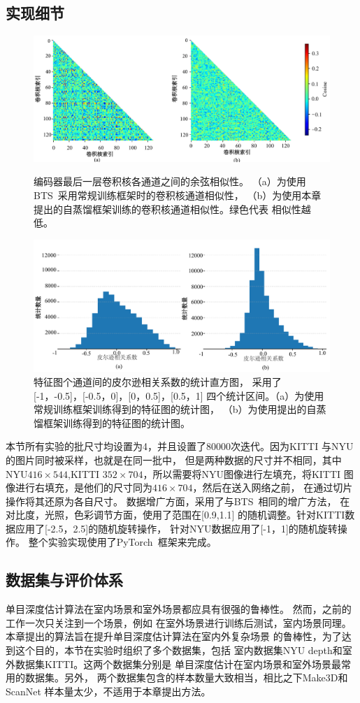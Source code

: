 \subsection{实现细节}
\begin{figure}[t]
  \centering
  \includegraphics[width=0.85\linewidth]{figure/conv_co.pdf}
  \caption{编码器最后一层卷积核各通道之间的余弦相似性。
（a）为使用BTS~\cite{bts}采用常规训练框架时的卷积核通道相似性，
（b）为使用本章提出的自蒸馏框架训练的卷积核通道相似性。绿色代表
相似性越低。}
  \label{fig:conv_co}
  \includegraphics[width=0.85\linewidth]{figure/fea_co.pdf}
  \caption{特征图个通道间的皮尔逊相关系数的统计直方图，
  采用了[-1，-0.5]，[-0.5，0]，[0，0.5]，[0.5，1]
  四个统计区间。（a）为使用常规训练框架训练得到的特征图的统计图，
  （b）为使用提出的自蒸馏框架训练得到的特征图的统计图。}
  \label{fig:fea_co}
\end{figure}
本节所有实验的批尺寸均设置为4，并且设置了80000次迭代。因为KITTI
与NYU的图片同时被采样，也就是在同一批中，
但是两种数据的尺寸并不相同，其中NYU$416\times544$,KITTI
$352\times704$，所以需要将NYU图像进行左填充，将KITTI
图像进行右填充，是他们的尺寸同为$416\times704$，然后在送入网络之前，
在通过切片操作将其还原为各自尺寸。
数据增广方面，采用了与BTS~\cite{bts}相同的增广方法，
在对比度，光照，色彩调节方面，使用了范围在[0.9,1.1]
的随机调整。针对KITTI数据应用了[-2.5，2.5]的随机旋转操作，
针对NYU数据应用了[-1，1]的随机旋转操作。
整个实验实现使用了PyTorch~\cite{paszke2019pytorch}框架来完成。
\subsection{数据集与评价体系}
单目深度估计算法在室内场景和室外场景都应具有很强的鲁棒性。
然而，之前的工作一次只关注到一个场景，例如
在室外场景进行训练后测试，室内场景同理。
本章提出的算法旨在提升单目深度估计算法在室内外复杂场景
的鲁棒性，为了达到这个目的，本节在实验时组织了多个数据集，包括
室内数据集NYU depth和室外数据集KITTI。这两个数据集分别是
单目深度估计在室内场景和室外场景最常用的数据集。另外，
两个数据集包含的样本数量大致相当，相比之下Make3D和ScanNet
样本量太少，不适用于本章提出方法。

